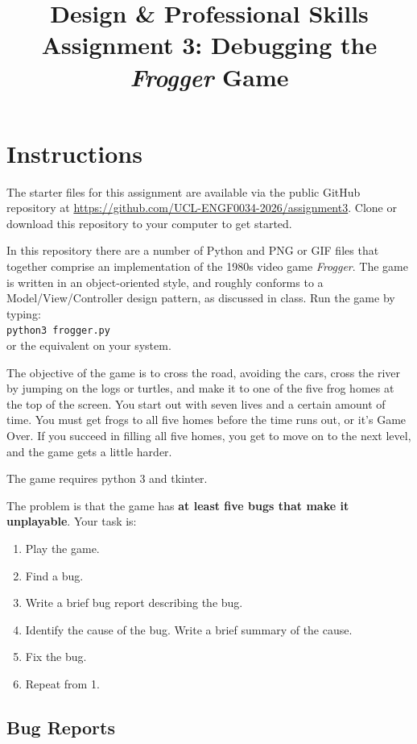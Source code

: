 \documentclass{article}
\title{Design \& Professional Skills\\
  Assignment 3: Debugging the {\em Frogger} Game}
\author{}
\date{}
\begin{document}
\maketitle

\section*{Instructions}

The starter files for this assignment are available via the public GitHub repository at \url{https://github.com/UCL-ENGF0034-2026/assignment3}. Clone or download this repository to your computer to get started.

In this repository there are a number of Python and PNG or GIF files that together comprise an implementation of the 1980s video game \textit{Frogger}.  The game is written in an object-oriented
style, and roughly conforms to a Model/View/Controller design pattern,
as discussed in class.  Run the game by typing:\\ \texttt{python3
  frogger.py}\\ or the equivalent on your system.  

The objective of the game is to cross the road, avoiding the cars,
cross the river by jumping on the logs or turtles, and make it to one
of the five frog homes at the top of the screen.  You start out with
seven lives and a certain amount of time.  You must get frogs to all
five homes before the time runs out, or it's Game Over.  If you
succeed in filling all five homes, you get to move on to the next
level, and the game gets a little harder.

The game requires python 3 and tkinter.

The problem is that the game has \textbf{at least five bugs that make it unplayable}.  Your task is:
\begin{enumerate}
\item Play the game.
\item Find a bug.
\item Write a brief bug report describing the bug.
\item Identify the cause of the bug.  Write a brief summary of the cause.
\item Fix the bug.
\item Repeat from 1.
\end{enumerate}

\subsection*{Bug Reports}
\end{document}
